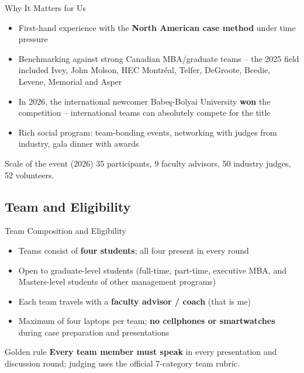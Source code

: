 \documentclass[aspectratio=169,11pt]{beamer}
\begin{document}
\begin{frame}{Why It Matters for Us}
  \begin{itemize}
    \item First-hand experience with the \textbf{North American case method} under time pressure
    \item Benchmarking against strong Canadian MBA/graduate teams -- the 2025 field included Ivey, John Molson, HEC Montr\'eal, Telfer, DeGroote, Beedie, Levene, Memorial and Asper
    \item In 2026, the international newcomer Babe\c{s}-Bolyai University \textbf{won} the competition -- international teams can absolutely compete for the title
    \item Rich social program: team-bonding events, networking with judges from industry, gala dinner with awards
  \end{itemize}
  \begin{exampleblock}{Scale of the event (2026)}
    35 participants, 9 faculty advisors, 50 industry judges, 52 volunteers.
  \end{exampleblock}
\end{frame}

\subsection{Team and Eligibility}

\begin{frame}{Team Composition and Eligibility}
  \begin{itemize}
    \item Teams consist of \textbf{four students}; all four present in every round
    \item Open to graduate-level students (full-time, part-time, executive MBA, and Masters-level students of other management programs)
    \item Each team travels with a \textbf{faculty advisor / coach} (that is me)
    \item Maximum of four laptops per team; \textbf{no cellphones or smartwatches} during case preparation and presentations
  \end{itemize}
  \begin{alertblock}{Golden rule}
    \textbf{Every team member must speak} in every presentation and discussion round; judging uses the official 7-category team rubric.
  \end{alertblock}
\end{frame}
\end{document}

